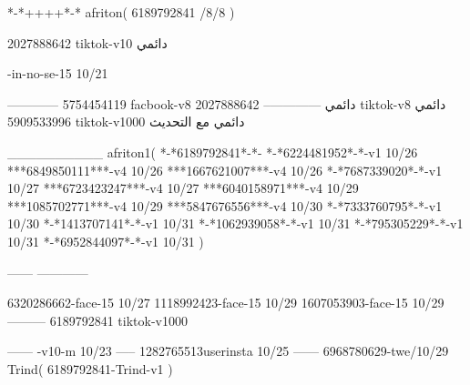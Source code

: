 *-*++++*-*
afriton(
6189792841 /8/8
)

2027888642 tiktok-v10
دائمي


-in-no-se-15 10/21

------------
5754454119 facbook-v8
دائمي
--------------
2027888642 tiktok-v8
دائمي
5909533996 tiktok-v1000
دائمي مع التحديث

__________
afriton1(
*-*6189792841*-*-
*-*6224481952*-*-v1 10/26
***6849850111***-v4 10/26
***1667621007***-v4 10/26
*-*7687339020*-*-v1 10/27
***6723423247***-v4 10/27
***6040158971***-v4 10/29
***1085702771***-v4 10/29
***5847676556***-v4 10/30
*-*7333760795*-*-v1 10/30
*-*1413707141*-*-v1 10/31
*-*1062939058*-*-v1 10/31
*-*795305229*-*-v1 10/31
*-*6952844097*-*-v1 10/31
)

------
------------


6320286662-face-15 10/27
1118992423-face-15 10/29
1607053903-face-15 10/29
---------
6189792841 tiktok-v1000

------
-v10-m 10/23
-----
1282765513userinsta 10/25
------
6968780629-twe/10/29
Trind(
6189792841-Trind-v1 
)
